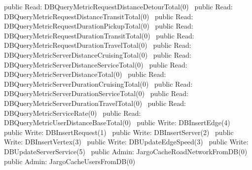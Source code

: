 public \LA{}Read: DBQueryMetricRequestDistanceDetourTotal(0)~{\nwtagstyle{}}\RA{}
public \LA{}Read: DBQueryMetricRequestDistanceTransitTotal(0)~{\nwtagstyle{}}\RA{}
public \LA{}Read: DBQueryMetricRequestDurationPickupTotal(0)~{\nwtagstyle{}}\RA{}
public \LA{}Read: DBQueryMetricRequestDurationTransitTotal(0)~{\nwtagstyle{}}\RA{}
public \LA{}Read: DBQueryMetricRequestDurationTravelTotal(0)~{\nwtagstyle{}}\RA{}
public \LA{}Read: DBQueryMetricServerDistanceCruisingTotal(0)~{\nwtagstyle{}}\RA{}
public \LA{}Read: DBQueryMetricServerDistanceServiceTotal(0)~{\nwtagstyle{}}\RA{}
public \LA{}Read: DBQueryMetricServerDistanceTotal(0)~{\nwtagstyle{}}\RA{}
public \LA{}Read: DBQueryMetricServerDurationCruisingTotal(0)~{\nwtagstyle{}}\RA{}
public \LA{}Read: DBQueryMetricServerDurationServiceTotal(0)~{\nwtagstyle{}}\RA{}
public \LA{}Read: DBQueryMetricServerDurationTravelTotal(0)~{\nwtagstyle{}}\RA{}
public \LA{}Read: DBQueryMetricServiceRate(0)~{\nwtagstyle{}}\RA{}
public \LA{}Read: DBQueryMetricUserDistanceBaseTotal(0)~{\nwtagstyle{}}\RA{}
\nwendcode{}\nwdocspar
{}
\nwenddocs{}\plusendmoddef
public \LA{}Write: DBInsertEdge(4)~{\nwtagstyle{}}\RA{}
public \LA{}Write: DBInsertRequest(1)~{\nwtagstyle{}}\RA{}
public \LA{}Write: DBInsertServer(2)~{\nwtagstyle{}}\RA{}
public \LA{}Write: DBInsertVertex(3)~{\nwtagstyle{}}\RA{}
public \LA{}Write: DBUpdateEdgeSpeed(3)~{\nwtagstyle{}}\RA{}
public \LA{}Write: DBUpdateServerService(5)~{\nwtagstyle{}}\RA{}
\nwendcode{}\nwdocspar
{}
\nwenddocs{}\plusendmoddef
public \LA{}Admin: JargoCacheRoadNetworkFromDB(0)~{\nwtagstyle{}}\RA{}
public \LA{}Admin: JargoCacheUsersFromDB(0)~{\nwtagstyle{}}\RA{}
